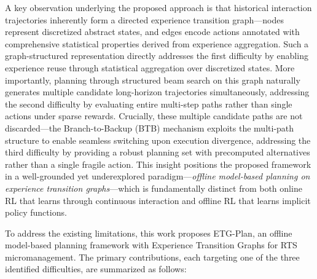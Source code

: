 \documentclass[letterpaper]{article}
\begin{document}
A key observation underlying the proposed approach is that historical interaction trajectories inherently form a directed experience transition graph---nodes represent discretized abstract states, and edges encode actions annotated with comprehensive statistical properties derived from experience aggregation. Such a graph-structured representation directly addresses the first difficulty by enabling experience reuse through statistical aggregation over discretized states. More importantly, planning through structured beam search on this graph naturally generates multiple candidate long-horizon trajectories simultaneously, addressing the second difficulty by evaluating entire multi-step paths rather than single actions under sparse rewards. Crucially, these multiple candidate paths are not discarded---the Branch-to-Backup (BTB) mechanism exploits the multi-path structure to enable seamless switching upon execution divergence, addressing the third difficulty by providing a robust planning set with precomputed alternatives rather than a single fragile action. This insight positions the proposed framework in a well-grounded yet underexplored paradigm---\textit{offline model-based planning on experience transition graphs}---which is fundamentally distinct from both online RL that learns through continuous interaction and offline RL that learns implicit policy functions.

To address the existing limitations, this work proposes ETG-Plan, an offline model-based planning framework with Experience Transition Graphs for RTS micromanagement. The primary contributions, each targeting one of the three identified difficulties, are summarized as follows:
\end{document}
